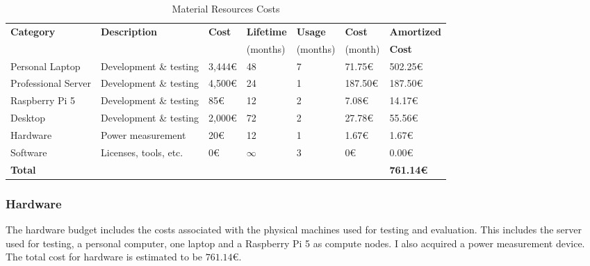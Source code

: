 \begin{table}[h]
  \vspace{1em}
  \noindent\hspace*{-1.7cm}
  \begin{tabular}{|lllllll|}
    \hline
    \multirow{1}{*}{\textbf{Category}} & \textbf{Description}   & \textbf{Cost} & \textbf{Lifetime} & \textbf{Usage} & \textbf{Cost} & \textbf{Amortized} \\
    & & & (months) & (months) & (month) & \textbf{Cost} \\
    \hline
    Personal Laptop       & Development \& testing  & 3,444€   & 48        & 7     & 71.75€     & 502.25€  \\
    Professional Server   & Development \& testing  & 4,500€   & 24        & 1     & 187.50€    & 187.50€  \\
    Raspberry Pi 5        & Development \& testing  & 85€      & 12        & 2     & 7.08€      & 14.17€   \\
    Desktop      & Development \& testing  & 2,000€   & 72        & 2     & 27.78€     & 55.56€   \\
    Hardware              & Power measurement       & 20€      & 12        & 1     & 1.67€      & 1.67€    \\
    Software              & Licenses, tools, etc.   & 0€       & $\infty$  & 3     & 0€         & 0.00€    \\
    \hline
    \textbf{Total}        & & & & & & \textbf{761.14€} \\
    \hline
  \end{tabular}
  
  \caption{Material Resources Costs}
  \label{tab:material-resources}
\end{table}

\subsubsection{Hardware}
The hardware budget includes the costs associated with the physical machines used for testing and evaluation. This includes the server used for testing, a personal computer, one laptop and a Raspberry Pi 5 as compute nodes. I also acquired a power measurement device. The total cost for hardware is estimated to be $761.14$€.

